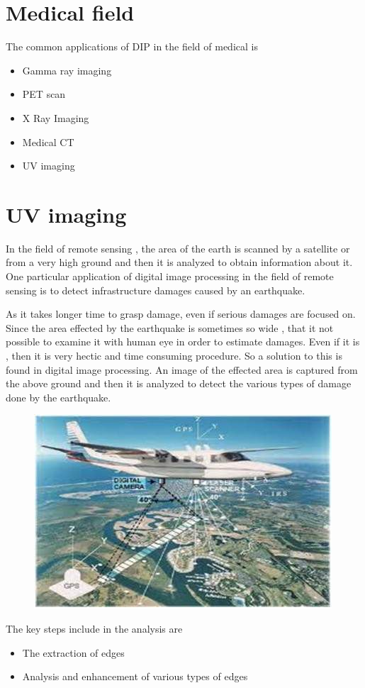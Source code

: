 \documentclass[a4paper]{article}
\begin{document}
 \section{Medical field}
 The common applications of DIP in the field of medical is
  \begin{itemize}
    \item Gamma ray imaging
  \item PET scan
  \item X Ray Imaging
  \item Medical CT
  \item UV imaging
  \end{itemize}
  \newpage
 \section{UV imaging}
 In the field of remote sensing , the area of the earth is scanned by a satellite or from a very high ground and then it is analyzed to obtain information about it. One particular application of digital image processing in the field of remote sensing is to detect infrastructure damages caused by an earthquake.

As it takes longer time to grasp damage, even if serious damages are focused on. Since the area effected by the earthquake is sometimes so wide , that it not possible to examine it with human eye in order to estimate damages. Even if it is , then it is very hectic and time consuming procedure. So a solution to this is found in digital image processing. An image of the effected area is captured from the above ground and then it is analyzed to detect the various types of damage done by the earthquake.
\begin{figure}[h]
\centering
\includegraphics{sm}
\end{figure}
The key steps include in the analysis are
\begin{itemize}
\item The extraction of edges
\item Analysis and enhancement of various types of edges
\end{itemize}
\newpage
 
\end{document}
